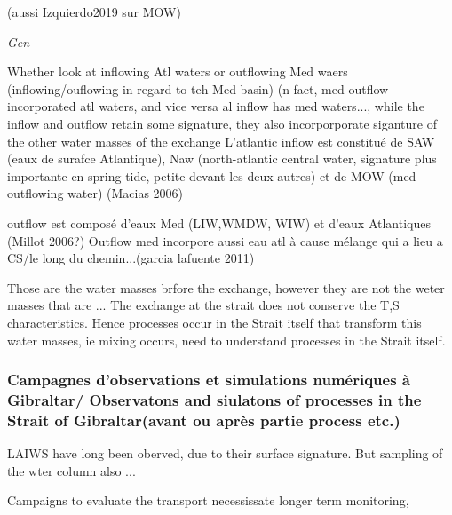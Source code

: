 (aussi Izquierdo2019 sur MOW)


\textit{Gen}

Whether look at inflowing Atl waters or outflowing Med waers (inflowing/ouflowing in regard to teh Med basin) (n fact, med outflow incorporated atl waters, and vice versa al inflow has med waters..., while the inflow and outflow retain some signature, they also incorporporate siganture of the other water masses of the exchange
L’atlantic inflow est constitué de SAW (eaux de surafce Atlantique), Naw (north-atlantic central water, signature plus importante en spring tide, petite devant les deux autres) et de MOW (med outflowing water) (Macias 2006)

outflow est composé d’eaux Med (LIW,WMDW, WIW) et d’eaux Atlantiques (Millot 2006?)
Outflow med incorpore aussi eau atl à cause mélange qui a lieu a CS/le long du chemin...(garcia lafuente 2011)   

Those are the water masses brfore the exchange, however they are not the weter masses that are ... The exchange at the strait does not conserve the T,S characteristics. Hence processes occur in the Strait itself that transform this water masses, ie mixing occurs, need to understand processes in the Strait itself.

\subsubsection{Campagnes d'observations et simulations numériques à Gibraltar/ Observatons and siulatons of processes in the Strait of Gibraltar(avant ou après partie process etc.)}

LAIWS have long been oberved, due to their surface signature.   But sampling of the wter column also ...

Campaigns to evaluate the transport necessissate longer term monitoring, 

